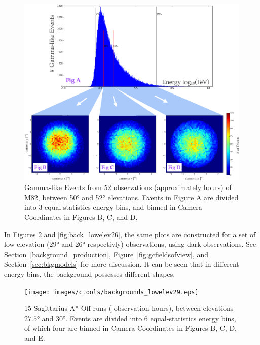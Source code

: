     \begin{figure}[ht]
      \centering
      \includegraphics[width=\textwidth]{images/ctools/backgrounds_highelev.eps}
      \caption[FITS Background at \ang{50} Elevation]{
        Gamma-like Events from 52 observations (approximately  hours) of M82, between \ang{50} and \ang{52} elevations.
        Events in Figure A are divided into 3 equal-statistics energy bins, and binned in Camera Coordinates in Figures B, C, and D.
      }
      \label{fig:back_highelev}
    \end{figure}

    In Figures \ref{fig:back_lowelev29} and \ref{fig:back_lowelev26}, the same plots are constructed for a set of low-elevation (\nicetilde{}\ang{29} and \nicetilde{}\ang{26} respectivly) observations, using dark observations.
    See Section~\ref{background_production}, Figure~\ref{fig:gcfieldsofview}, and Section~\ref{sec:bkgmodels} for more discussion.
    It can be seen that in different energy bins, the background possesses different shapes.

    \begin{figure}[ht]
      \centering
      \texttt{[image: images/ctools/backgrounds\_lowelev29.eps]}
      \caption[CTOOLS Background at \ang{29} Elevation]{
        15 Sagittarius A* Off runs ( observation hours), between elevations $ \ang{27.5} $ and $ \ang{30} $.
        Events are divided into 6 equal-statistics energy bins, of which four are binned in Camera Coordinates in Figures B, C, D, and E.
      }
      \label{fig:back_lowelev29}
    \end{figure}


